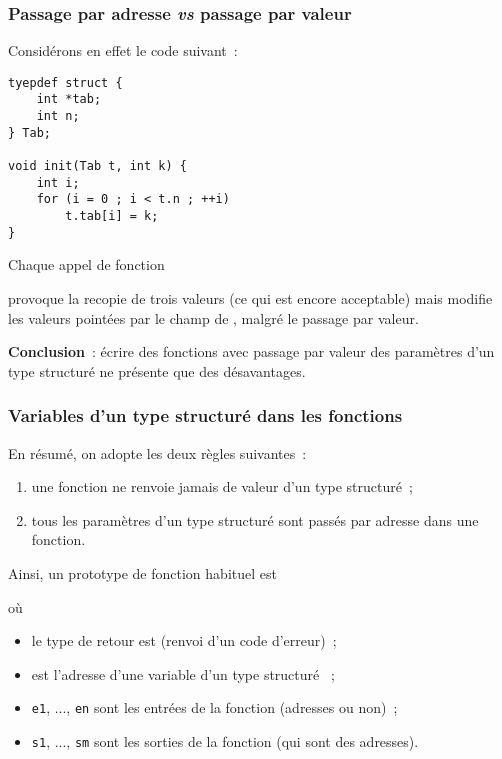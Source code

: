 \begin{frame}[fragile]
\frametitle{Passage par adresse {\em vs} passage par valeur}
Considérons en effet le code suivant~:
\begin{multicols}{2}
\begin{lstlisting}
tyepdef struct {
    int *tab;
    int n;
} Tab;

void init(Tab t, int k) {
    int i;
    for (i = 0 ; i < t.n ; ++i)
        t.tab[i] = k;
}
\end{lstlisting}
\end{multicols}
Chaque appel de fonction
\begin{center}
\end{center}
provoque la recopie de trois valeurs (ce qui est encore acceptable) mais
\og modifie \fg\, les valeurs pointées par le champ  de ,
malgré le passage par valeur.
\bigskip

{\bf Conclusion}~: écrire des fonctions avec passage par valeur des
paramètres d'un type structuré ne présente que des désavantages.
\end{frame}

\begin{frame}[fragile]
\frametitle{Variables d'un type structuré dans les fonctions}
En résumé, on adopte les deux règles suivantes~:
\smallskip

\begin{enumerate}
    \item une fonction ne renvoie jamais de valeur d'un type structuré~;
    \smallskip

    \item tous les paramètres d'un type structuré sont passés par adresse
    dans une fonction.
\end{enumerate}
\medskip

Ainsi, un prototype de fonction habituel est
\begin{center}
\end{center}
où
\begin{itemize}
    \item le type de retour est  (renvoi d'un code d'erreur)~;
    \smallskip

    \item {} est l'adresse d'une variable d'un type structuré ~;
    \smallskip

    \item \textcolor{Rouge}{\tt e1}, ..., \textcolor{Rouge}{\tt en}
    sont les entrées de la fonction (adresses ou non)~;
    \smallskip

    \item \textcolor{Vert}{\tt s1}, ..., \textcolor{Vert}{\tt sm}
    sont les sorties de la fonction (qui sont des adresses).
\end{itemize}
\end{frame}

